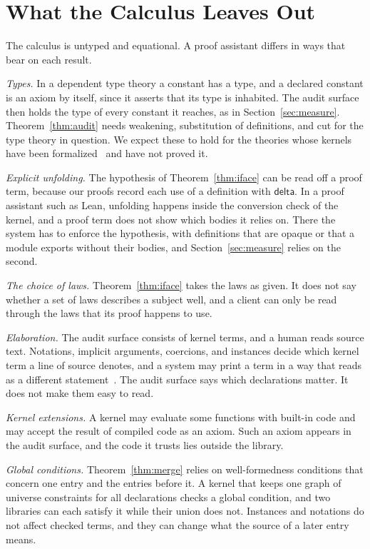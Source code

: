 \documentclass[acmsmall,nonacm,screen]{acmart}
\newcommand{\kw}[1]{\mathsf{#1}}
\begin{document}
\section{What the Calculus Leaves Out}
\label{sec:limits}

The calculus is untyped and equational. A proof assistant differs in ways that bear on each
result.

\emph{Types.} In a dependent type theory a constant has a type, and a declared constant is an
axiom by itself, since it asserts that its type is inhabited. The audit surface then holds the
type of every constant it reaches, as in Section~\ref{sec:measure}. Theorem~\ref{thm:audit}
needs weakening, substitution of definitions, and cut for the type theory in question. We expect
these to hold for the theories whose kernels have been formalized~\citep{sozeau2020,carneiro2024}
and have not proved it.

\emph{Explicit unfolding.} The hypothesis of Theorem~\ref{thm:iface} can be read off a proof
term, because our proofs record each use of a definition with $\kw{delta}$. In a proof assistant
such as Lean, unfolding happens inside the conversion check of the kernel, and a proof term does
not show which bodies it relies on. There the system has to enforce the hypothesis, with
definitions that are opaque or that a module exports without their bodies, and
Section~\ref{sec:measure} relies on the second.

\emph{The choice of laws.} Theorem~\ref{thm:iface} takes the laws as given. It does not say
whether a set of laws describes a subject well, and a client can only be read through the laws
that its proof happens to use.

\emph{Elaboration.} The audit surface consists of kernel terms, and a human reads source text.
Notations, implicit arguments, coercions, and instances decide which kernel term a line of
source denotes, and a system may print a term in a way that reads as a different
statement~\citep{pollack1998,wiedijk2012}. The audit surface says which declarations matter. It
does not make them easy to read.

\emph{Kernel extensions.} A kernel may evaluate some functions with built-in code and may accept
the result of compiled code as an axiom. Such an axiom appears in the audit surface, and the code
it trusts lies outside the library.

\emph{Global conditions.} Theorem~\ref{thm:merge} relies on well-formedness conditions that
concern one entry and the entries before it. A kernel that keeps one graph of universe constraints
for all declarations checks a global condition, and two libraries can each satisfy it while their
union does not. Instances and notations do not affect checked terms, and they can change what
the source of a later entry means.
\end{document}
